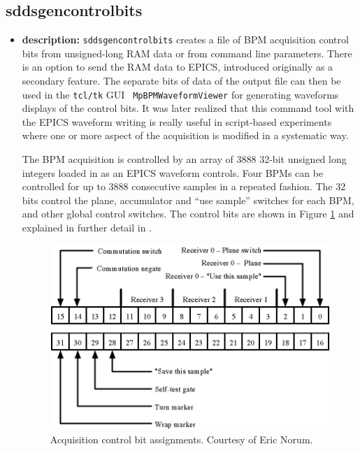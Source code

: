 %
%
\begin{latexonly}
\newpage
\end{latexonly}


\subsection{sddsgencontrolbits}
\label{sddsgencontrolbits}

\begin{itemize}
\item {\bf description:}
%
%
\verb+sddsgencontrolbits+ creates a file of BPM acquisition control
bits from unsigned-long RAM data or from command line
parameters. There is an option to send the RAM data to EPICS,
introduced originally as a secondary feature. The separate bits of
data of the output file can then be used in the {\tt tcl/tk} GUI {\tt
MpBPMWaveformViewer} for generating waveforms displays of the control
bits. It was later realized that this command tool with the EPICS
waveform writing is really useful in script-based experiments where one
or more aspect of the acquisition is modified in a systematic way.

The BPM acquisition is controlled by an array of 3888 32-bit unsigned
long integers loaded in as an EPICS waveform controls. Four BPMs can
be controlled for up to 3888 consecutive samples in a repeated
fashion.  The 32 bits control the plane, accumulator and ``use
sample'' switches for each BPM, and other global control switches. The
control bits are shown in Figure \ref{fig:acquisitionControlRam} and
explained in further detail in \cite{Norum2007}.

\begin{figure}[htb]
\centering
\includegraphics[width=\textwidth]{acquisitionControlRam.eps}
\caption{Acquisition control bit assignments. Courtesy of Eric Norum.}
\label{fig:acquisitionControlRam}
\end{figure}


\end{itemize}
